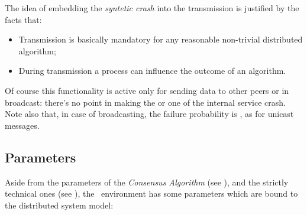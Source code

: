 The idea of embedding the \emph{syntetic crash} into the transmission is
justified by the facts that:
\begin{itemize}

\item   Transmission is basically mandatory for any reasonable non-trivial
        distributed algorithm;

\item   During transmission a process can influence the outcome of an
        algorithm.

\end{itemize}

Of course this functionality is active only for  sending
data to other peers or in broadcast: there's no point in making the
 or one of the internal service crash. Note also that,
in case of broadcasting, the failure probability is \PCrash, as for
unicast messages.


\subsection{Parameters} \label{sub:EnvParams}

Aside from the parameters of the \emph{Consensus Algorithm}
(see ), and the strictly technical ones
(see ), the \YUNA\ environment has some
parameters which are bound to the distributed system model:

